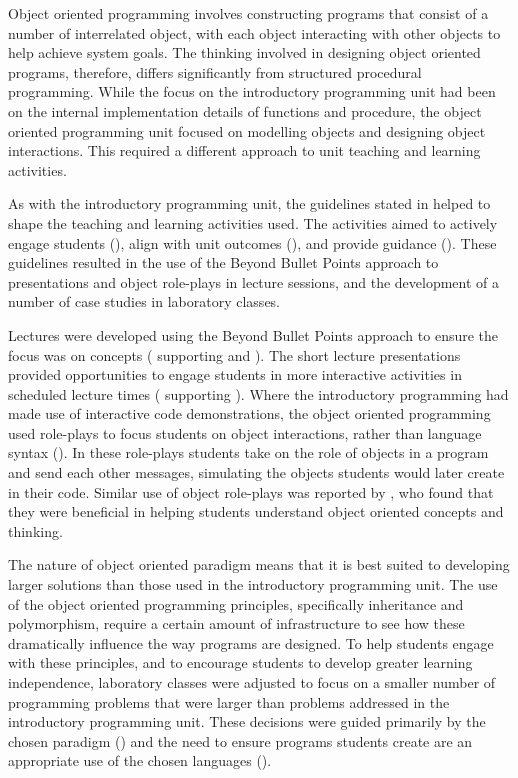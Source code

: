 Object oriented programming involves constructing programs that consist of a number of interrelated object, with each object interacting with other objects to help achieve system goals. The thinking involved in designing object oriented programs, therefore, differs significantly from structured procedural programming. While the focus on the introductory programming unit had been on the internal implementation details of functions and procedure, the object oriented programming unit focused on modelling objects and designing object interactions. This required a different approach to unit teaching and learning activities.

As with the introductory programming unit, the guidelines stated in  helped to shape the teaching and learning activities used. The activities aimed to actively engage students (), align with unit outcomes (), and provide guidance (). These guidelines resulted in the use of the Beyond Bullet Points approach to presentations and object role-plays in lecture sessions, and the development of a number of case studies in laboratory classes.

Lectures were developed using the Beyond Bullet Points approach to ensure the focus was on concepts ( supporting  and ). The short lecture presentations provided opportunities to engage students in more interactive activities in scheduled lecture times ( supporting ). Where the introductory programming had made use of interactive code demonstrations, the object oriented programming used role-plays to focus students on object interactions, rather than language syntax (). In these role-plays students take on the role of objects in a program and send each other messages, simulating the objects students would later create in their code. Similar use of object role-plays was reported by \citet{Borstler:2005}, who found that they were beneficial in helping students understand object oriented concepts and thinking. 

The nature of object oriented paradigm means that it is best suited to developing larger solutions than those used in the introductory programming unit. The use of the object oriented programming principles, specifically inheritance and polymorphism, require a certain amount of infrastructure to see how these dramatically influence the way programs are designed. To help students engage with these principles, and to encourage students to develop greater learning independence, laboratory classes were adjusted to focus on a smaller number of programming problems that were larger than problems addressed in the introductory programming unit. These decisions were guided primarily by the chosen paradigm () and the need to ensure programs students create are an appropriate use of the chosen languages ().
 
